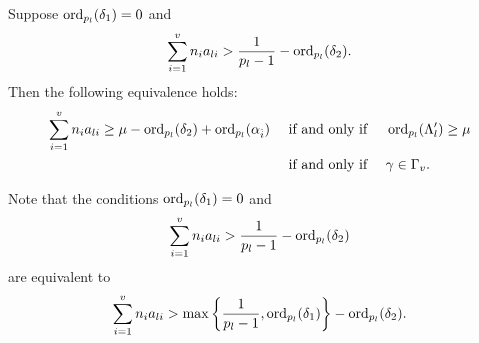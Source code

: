 \begin{lemma}
Suppose $\operatorname{ord}_{p_l}(\delta_1) = 0$ and 
\[\sum_{i = 1}^v n_{i}a_{li} > \frac{1}{p_l-1} - \operatorname{ord}_{p_l}(\delta_2).\]
Then the following equivalence holds: 
\begin{align*}
\sum_{i = 1}^v n_{i}a_{li}  \geq \mu - \operatorname{ord}_{p_l}(\delta_2) + \operatorname{ord}_{p_l}(\alpha_{\hat{i}}) 
	& \quad \text{ if and only if } \quad \operatorname{ord}_{p_l}(\Lambda_l') \geq \mu \\
	& \quad \text{ if and only if } \quad \gamma \in\Gamma_v.
\end{align*}
\end{lemma} 

\begin{remark}
Note that the conditions $\operatorname{ord}_{p_l}(\delta_1) = 0$ and 
\[\sum_{i = 1}^v n_{i}a_{li} > \frac{1}{p_l-1} - \operatorname{ord}_{p_l}(\delta_2)\]
are equivalent to 
\[\sum_{i = 1}^v n_{i}a_{li} > \max\left\{\frac{1}{p_l-1}, \operatorname{ord}_{p_l}(\delta_1)\right\} - \operatorname{ord}_{p_l}(\delta_2).\]
\end{remark}

